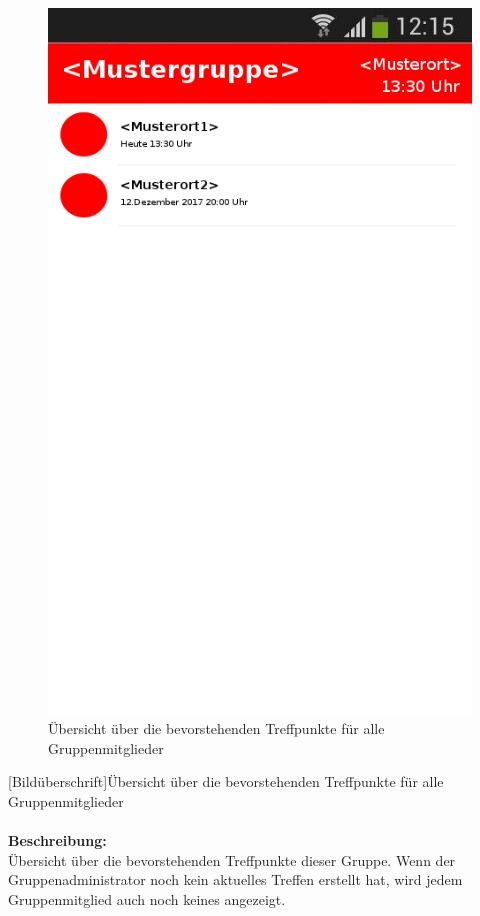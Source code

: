 \begin{figure}[H]
	\caption{Übersicht über die bevorstehenden Treffpunkte für alle Gruppenmitglieder}
\begin{center}
	\includegraphics[scale =0.5]{resources/images/treffpunktuebersicht.png}
\end{center}
\end{figure}
[Bildüberschrift]Übersicht über die bevorstehenden Treffpunkte für alle Gruppenmitglieder\\ \\
\textbf{Beschreibung:}\\
Übersicht über die bevorstehenden Treffpunkte dieser Gruppe. Wenn der Gruppenadministrator noch kein aktuelles Treffen erstellt hat, wird jedem Gruppenmitglied auch noch keines angezeigt.\\
